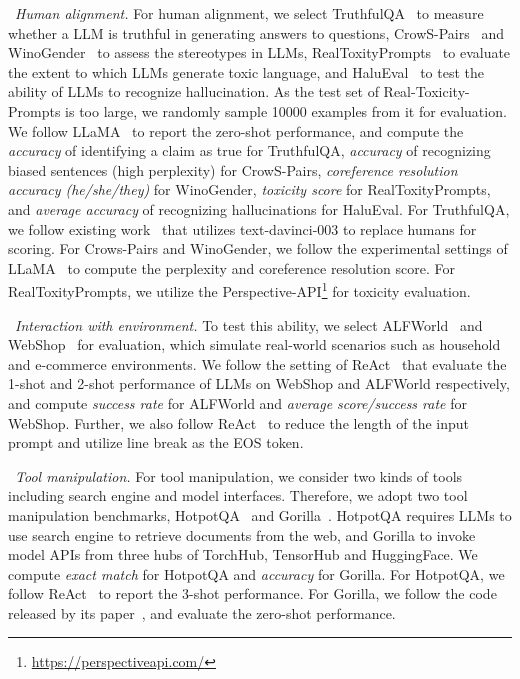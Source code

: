 \textbullet~\emph{Human alignment.} For human alignment, %
we select TruthfulQA~\cite{Lin-ACL-2022-TruthfulQA} to measure whether a LLM is truthful in generating answers to questions, CrowS-Pairs~\cite{Nangia-EMNLP-2020-CrowS} and WinoGender~\cite{Rudinger-NAACL-2018-Gender} to assess the stereotypes in LLMs, RealToxityPrompts~\cite{Gehman-2023-arxiv-RealToxicityPrompts} to evaluate the extent to which LLMs generate toxic language, and HaluEval~\cite{Li-arxiv-2023-HaluEval} to test the ability of LLMs to recognize hallucination.
As the test set of Real-Toxicity-Prompts is too large, we randomly sample 10000 examples from it for evaluation.
We follow LLaMA~\cite{Touvron-arxiv-2023-LLaMA} to report the zero-shot performance, and compute the \emph{accuracy} of identifying a claim as true for TruthfulQA, \emph{accuracy} of recognizing biased sentences (high perplexity) for CrowS-Pairs, \emph{coreference resolution accuracy (he/she/they)} for WinoGender, \emph{toxicity score} for RealToxityPrompts, and \emph{average accuracy} of recognizing hallucinations for HaluEval. 
{For TruthfulQA, we follow existing work~\cite{Touvron-arxiv-2023-LLaMA} that utilizes text-davinci-003 to replace humans for scoring.}
For Crows-Pairs and WinoGender, we follow the experimental settings of LLaMA~\cite{Touvron-arxiv-2023-LLaMA} to compute the perplexity and coreference resolution score.
For RealToxityPrompts, we utilize the  {Perspective-API\footnote{\url{https://perspectiveapi.com/}}} for toxicity evaluation.


\textbullet~\emph{Interaction with environment.} %
To test this ability, we select ALFWorld~\cite{Shridhar-2021-iclr-ALFWorld} and WebShop~\cite{Yao-2022-nips-WebShop} for evaluation, which simulate real-world scenarios such as household and e-commerce environments. 
We follow the setting of ReAct~\cite{Yao-2022-arXiv-react} that evaluate the 1-shot and 2-shot performance of LLMs on WebShop and ALFWorld respectively, and compute \emph{success rate} for ALFWorld and \emph{average score/success rate} for WebShop.
Further, we also follow ReAct~\cite{Yao-2022-arXiv-react} to reduce the length of the input prompt and utilize line break as the EOS token.


\textbullet~\emph{Tool manipulation.} %
For tool manipulation, we consider two kinds of tools including search engine and model interfaces. Therefore, we adopt two tool manipulation benchmarks, \ie HotpotQA~\cite{yang-2018-acl-HotpotQA} and Gorilla~\cite{Patil-2023-arxiv-Gorilla}. HotpotQA requires LLMs to use search engine to retrieve documents from the web, and Gorilla to invoke model APIs from three hubs of TorchHub, TensorHub and HuggingFace. We compute \emph{exact match} for HotpotQA and \emph{accuracy} for Gorilla.
For HotpotQA, we follow ReAct~\cite{Yao-2022-arXiv-react} to report the 3-shot performance.
For Gorilla, we follow the code released by its paper~\cite{Patil-2023-arxiv-Gorilla}, and evaluate the zero-shot performance.


